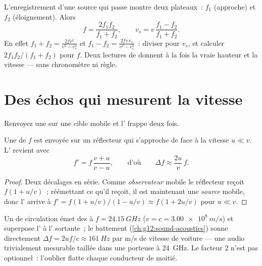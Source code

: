 \begin{method}\label{met:g12:doppler-effect:pass}
L'enregistrement d'une source qui passe montre deux plateaux~: $f_1$
(approche) et $f_2$ (éloignement). Alors
\[
f = \frac{2 f_1 f_2}{f_1 + f_2}, \qquad
v_s = v\,\frac{f_1 - f_2}{f_1 + f_2}.
\]
En effet $f_1 + f_2 = \frac{2fv^2}{v^2 - v_s^2}$ et
$f_1 - f_2 = \frac{2fv\,v_s}{v^2 - v_s^2}$~: diviser pour $v_s$, et
calculer $2f_1 f_2/(f_1 + f_2)$ pour $f$. Deux lectures de
 donnent à la fois la vraie
hauteur et la vitesse --- sans chronomètre ni règle.
\end{method}

\section{Des échos qui mesurent la vitesse}

Renvoyez une  sur une cible mobile et l'
frappe deux fois.

\begin{proposition}\label{prop:g12:doppler-effect:double}
Une  de  $f$ est envoyée sur un
réflecteur qui s'approche de face à la vitesse $u \ll v$.
L' revient avec
\[ f' = f\,\frac{v + u}{v - u}, \qquad \text{d'où} \qquad \Delta f \approx \frac{2u}{v}\,f . \]
\end{proposition}

\begin{proof}
Deux décalages en série. Comme \emph{observateur} mobile le réflecteur
reçoit $f(1 + u/v)$~; réémettant ce qu'il reçoit, il est maintenant
une \emph{source} mobile, donc l' arrive à
$f' = f(1 + u/v)/(1 - u/v) \approx f(1 + 2u/v)$ pour $u \ll v$.
\end{proof}

\begin{example}\label{ex:g12:doppler-effect:radar}
Un  de circulation émet des  à
$f = \qty{24.15}{GHz}$ ($v = c = \qty{3.00e8}{m/s}$) et superpose
l' à l' sortante~; le battement
(\cref{ch:g12:sound-acoustics}) sonne directement
$\Delta f = 2uf/c \approx \qty{161}{Hz}$ par \unit{m/s} de vitesse
de voiture --- une  audio trivialement mesurable
taillée dans une porteuse à \qty{24}{GHz}. Le facteur $2$ n'est pas
optionnel~: l'oublier flatte chaque conducteur de moitié.
\end{example}

